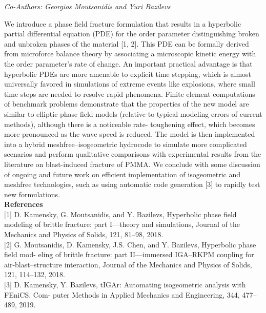 \begin{center}
\textit{Co-Authors: Georgios Moutsanidis and Yuri Bazilevs}
\end{center} 
We introduce a phase field fracture formulation that results in a hyperbolic partial differential
equation (PDE) for the order parameter distinguishing broken and unbroken phases of the
material [1, 2]. This PDE can be formally derived from microforce balance theory by associating
a microscopic kinetic energy with the order parameter’s rate of change. An important practical
advantage is that hyperbolic PDEs are more amenable to explicit time stepping, which is almost
universally favored in simulations of extreme events like explosions, where small time steps
are needed to resolve rapid phenomena. Finite element computations of benchmark problems
demonstrate that the properties of the new model are similar to elliptic phase field models
(relative to typical modeling errors of current methods), although there is a noticeable rate-
toughening effect, which becomes more pronounced as the wave speed is reduced. The model is
then implemented into a hybrid meshfree–isogeometric hydrocode to simulate more complicated
scenarios and perform qualitative comparisons with experimental results from the literature on
blast-induced fracture of PMMA. We conclude with some discussion of ongoing and future work
on efficient implementation of isogeometric and meshfree technologies, such as using automatic
code generation [3] to rapidly test new formulations.\\

\noindent\textbf{References}\\
$[$1$]$ D. Kamensky, G. Moutsanidis, and Y. Bazilevs, Hyperbolic phase field modeling of brittle
fracture: part I—theory and simulations, Journal of the Mechanics and Physics of Solids,
121, 81–98, 2018.\\\newline
$[$2$]$ G. Moutsanidis, D. Kamensky, J.S. Chen, and Y. Bazilevs, Hyperbolic phase field mod-
eling of brittle fracture: part II—immersed IGA–RKPM coupling for air-blast–structure
interaction, Journal of the Mechanics and Physics of Solids, 121, 114–132, 2018.\\\newline
$[$3$]$ D. Kamensky, Y. Bazilevs, tIGAr: Automating isogeometric analysis with FEniCS. Com-
puter Methods in Applied Mechanics and Engineering, 344, 477–489, 2019.
